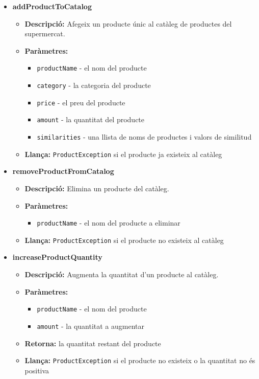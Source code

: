 \documentclass[a4paper, t]{article}
\begin{document}
\begin{itemize}
    \item \textbf{addProductToCatalog}
    \begin{itemize}
        \item \textbf{Descripció:} Afegeix un producte únic al catàleg de productes del supermercat.
        \item \textbf{Paràmetres:}
        \begin{itemize}
            \item \texttt{productName} - el nom del producte
            \item \texttt{category} - la categoria del producte
            \item \texttt{price} - el preu del producte
            \item \texttt{amount} - la quantitat del producte
            \item \texttt{similarities} - una llista de noms de productes i valors de similitud
        \end{itemize}
        \item \textbf{Llança:} \texttt{ProductException} si el producte ja existeix al catàleg
    \end{itemize}

    \item \textbf{removeProductFromCatalog}
    \begin{itemize}
        \item \textbf{Descripció:} Elimina un producte del catàleg.
        \item \textbf{Paràmetres:}
        \begin{itemize}
            \item \texttt{productName} - el nom del producte a eliminar
        \end{itemize}
        \item \textbf{Llança:} \texttt{ProductException} si el producte no existeix al catàleg
    \end{itemize}

    \item \textbf{increaseProductQuantity}
    \begin{itemize}
        \item \textbf{Descripció:} Augmenta la quantitat d'un producte al catàleg.
        \item \textbf{Paràmetres:}
        \begin{itemize}
            \item \texttt{productName} - el nom del producte
            \item \texttt{amount} - la quantitat a augmentar
        \end{itemize}
        \item \textbf{Retorna:} la quantitat restant del producte
        \item \textbf{Llança:} \texttt{ProductException} si el producte no existeix o la quantitat no és positiva
    \end{itemize}


\end{itemize}
\end{document}
